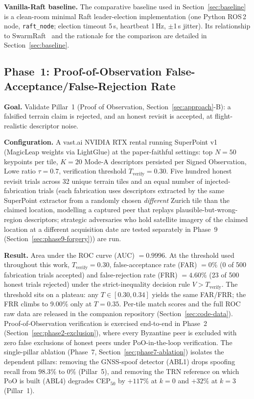 \documentclass[journal,10pt,twocolumn]{IEEEtran}
\begin{document}
\textbf{Vanilla-Raft baseline.} The comparative baseline used in Section~\ref{sec:baseline} is a clean-room minimal Raft leader-election implementation (one Python ROS\,2 node, \texttt{raft\_node}; election timeout 5\,s, heartbeat 1\,Hz, $\pm$1\,s jitter). Its relationship to SwarmRaft~\cite{dev2025swarmraft} and the rationale for the comparison are detailed in Section~\ref{sec:baseline}.

\subsection{Phase~1: Proof-of-Observation False-Acceptance/False-Rejection Rate}
\label{sec:phase1-poo}

\textbf{Goal.} Validate Pillar~1 (Proof of Observation, Section~\ref{sec:approach}-B): a falsified terrain claim is rejected, and an honest revisit is accepted, at flight-realistic descriptor noise.

\textbf{Configuration.} A vast.ai NVIDIA RTX rental running SuperPoint v1 (MagicLeap weights via LightGlue) at the paper-faithful settings: top $N=50$ keypoints per tile, $K=20$ Mode-A descriptors persisted per Signed Observation, Lowe ratio $\tau=0.7$, verification threshold $T_\text{verify}=0.30$. Five hundred honest revisit trials across 32 unique terrain tiles and an equal number of injected-fabrication trials (each fabrication uses descriptors extracted by the same SuperPoint extractor from a randomly chosen \emph{different} Zurich tile than the claimed location, modelling a captured peer that replays plausible-but-wrong-region descriptors; strategic adversaries who hold satellite imagery of the claimed location at a different acquisition date are tested separately in Phase~9 (Section~\ref{sec:phase9-forgery})) are run.

\textbf{Result.} Area under the ROC curve (AUC) $=0.9996$. At the threshold used throughout this work, $T_\text{verify}=0.30$, false-acceptance rate (FAR) $=0\%$ (0 of 500 fabrication trials accepted) and false-rejection rate (FRR) $=4.60\%$ (23 of 500 honest trials rejected) under the strict-inequality decision rule $V > T_\text{verify}$. The threshold sits on a plateau: any $T \in [0.30, 0.34]$ yields the same FAR/FRR; the FRR climbs to 9.00\% only at $T=0.35$. Per-tile match scores and the full ROC raw data are released in the companion repository (Section~\ref{sec:code-data}). Proof-of-Observation verification is exercised end-to-end in Phase~2 (Section~\ref{sec:phase2-exclusion}), where every Byzantine peer is excluded with zero false exclusions of honest peers under PoO-in-the-loop verification. The single-pillar ablation (Phase~7, Section~\ref{sec:phase7-ablation}) isolates the dependent pillars: removing the GNSS-spoof detector (ABL1) drops spoofing recall from $98.3\%$ to $0\%$ (Pillar~5), and removing the TRN reference on which PoO is built (ABL4) degrades CEP$_{50}$ by $+117\%$ at $k{=}0$ and $+32\%$ at $k{=}3$ (Pillar~1).
\end{document}
